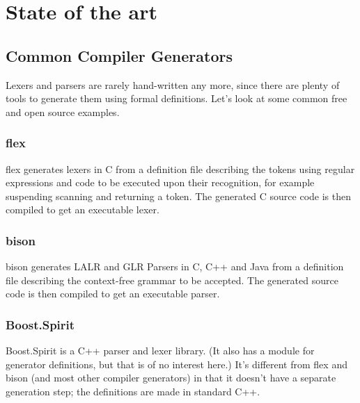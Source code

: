 
\chapter{State of the art}
        
        
	\section{Common Compiler Generators}
    	
		Lexers and parsers are rarely hand-written any more, since there are plenty of tools to generate them using formal definitions. Let's look at some common free and open source examples.
		
		\subsection{flex}
		
			flex\cite{flex} generates lexers in C from a definition file describing the tokens using regular expressions and code to be executed upon their recognition, for example suspending scanning and returning a token. The generated C source code is then compiled to get an executable lexer.
			
		
		\subsection{bison}
			
			bison\cite{bison} generates LALR and GLR Parsers in C, C++ and Java from a definition file describing the context-free grammar to be accepted. The generated source code is then compiled to get an executable parser.
		
		\subsection{Boost.Spirit}
			
			Boost.Spirit\cite{spirit} is a C++ parser and lexer library. (It also has a module for generator definitions, but that is of no interest here.) It's different from flex and bison (and most other compiler generators) in that it doesn't have a separate generation step; the definitions are made in standard C++.
			
